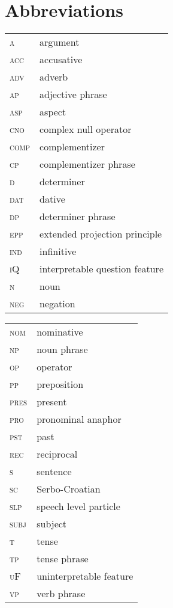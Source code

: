 \documentclass[output=paper,colorlinks,citecolor=brown,
]{langscibook}
\begin{document}
\section*{Abbreviations}
\begin{tabularx}{.5\textwidth}{lQ}
\textsc{a}    & argument                      \\
\textsc{acc}  & accusative                    \\
\textsc{adv}  & adverb                        \\
\textsc{ap}   & adjective phrase                \\
\textsc{asp}  & aspect                         \\
\textsc{cno}  & complex null operator             \\
\textsc{comp} & complementizer                         \\
\textsc{cp}   & complementizer phrase                   \\
\textsc{d}    & determiner                             \\
\textsc{dat}  & dative                                 \\
\textsc{dp}   & determiner phrase              \\
\textsc{epp}  & extended projection principle                \\
\textsc{ind}  & infinitive                                   \\
\textsc{iQ}   & interpretable question feature             \\
\textsc{n}    & noun                           \\
\textsc{neg}  & negation                            \\     
\end{tabularx}
\begin{tabularx}{.5\textwidth}{lQ}
 \textsc{nom}  & nominative              \\
 \textsc{np}   & noun phrase             \\
 \textsc{op}   & operator                \\
\textsc{pp}   & preposition             \\
 \textsc{pres} & present                 \\
\textsc{pro}  & pronominal anaphor      \\
 \textsc{pst}  & past                    \\
 \textsc{rec}  & reciprocal              \\
 \textsc{s}    & sentence                \\
\textsc{sc}   & Serbo-Croatian          \\
 \textsc{slp}  & speech level particle   \\
 \textsc{subj} & subject                 \\
 \textsc{t}    & tense                   \\
 \textsc{tp}   & tense phrase            \\
 \textsc{uF}   & uninterpretable feature \\
\textsc{vp}   & verb phrase            \\
\end{tabularx}
\end{document}
